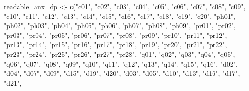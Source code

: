 \documentclass[
]{article}
\newenvironment{Shaded}{\begin{snugshade}}{\end{snugshade}}
\newcommand{\FunctionTok}[1]{\textcolor[rgb]{0.13,0.29,0.53}{\textbf{#1}}}
\newcommand{\NormalTok}[1]{#1}
\newcommand{\OtherTok}[1]{\textcolor[rgb]{0.56,0.35,0.01}{#1}}
\newcommand{\StringTok}[1]{\textcolor[rgb]{0.31,0.60,0.02}{#1}}
\begin{document}
\begin{Shaded}
\begin{Highlighting}[]
\NormalTok{readable\_anx\_dp }\OtherTok{\textless{}{-}} \FunctionTok{c}\NormalTok{(}\StringTok{"c01"}\NormalTok{, }\StringTok{"c02"}\NormalTok{, }\StringTok{"c03"}\NormalTok{, }\StringTok{"c04"}\NormalTok{, }\StringTok{"c05"}\NormalTok{, }\StringTok{"c06"}\NormalTok{, }\StringTok{"c07"}\NormalTok{, }\StringTok{"c08"}\NormalTok{, }\StringTok{"c09"}\NormalTok{, }\StringTok{"c10"}\NormalTok{, }\StringTok{"c11"}\NormalTok{, }\StringTok{"c12"}\NormalTok{, }\StringTok{"c13"}\NormalTok{, }\StringTok{"c14"}\NormalTok{, }\StringTok{"c15"}\NormalTok{, }\StringTok{"c16"}\NormalTok{, }\StringTok{"c17"}\NormalTok{, }\StringTok{"c18"}\NormalTok{, }\StringTok{"c19"}\NormalTok{, }\StringTok{"c20"}\NormalTok{, }
\StringTok{"ph01"}\NormalTok{, }\StringTok{"ph02"}\NormalTok{, }\StringTok{"ph03"}\NormalTok{, }\StringTok{"ph04"}\NormalTok{, }\StringTok{"ph05"}\NormalTok{, }\StringTok{"ph06"}\NormalTok{, }\StringTok{"ph07"}\NormalTok{, }\StringTok{"ph08"}\NormalTok{, }\StringTok{"ph09"}\NormalTok{, }
\StringTok{"pr01"}\NormalTok{, }\StringTok{"pr02"}\NormalTok{, }\StringTok{"pr03"}\NormalTok{, }\StringTok{"pr04"}\NormalTok{, }\StringTok{"pr05"}\NormalTok{, }\StringTok{"pr06"}\NormalTok{, }\StringTok{"pr07"}\NormalTok{, }\StringTok{"pr08"}\NormalTok{, }\StringTok{"pr09"}\NormalTok{, }\StringTok{"pr10"}\NormalTok{, }\StringTok{"pr11"}\NormalTok{, }\StringTok{"pr12"}\NormalTok{, }\StringTok{"pr13"}\NormalTok{, }\StringTok{"pr14"}\NormalTok{, }\StringTok{"pr15"}\NormalTok{, }\StringTok{"pr16"}\NormalTok{, }\StringTok{"pr17"}\NormalTok{, }\StringTok{"pr18"}\NormalTok{, }\StringTok{"pr19"}\NormalTok{, }\StringTok{"pr20"}\NormalTok{, }\StringTok{"pr21"}\NormalTok{, }\StringTok{"pr22"}\NormalTok{, }\StringTok{"pr23"}\NormalTok{, }\StringTok{"pr24"}\NormalTok{, }\StringTok{"pr25"}\NormalTok{, }\StringTok{"pr26"}\NormalTok{, }\StringTok{"pr27"}\NormalTok{, }\StringTok{"pr28"}\NormalTok{, }
\StringTok{"q01"}\NormalTok{, }\StringTok{"q02"}\NormalTok{, }\StringTok{"q03"}\NormalTok{, }\StringTok{"q04"}\NormalTok{, }\StringTok{"q05"}\NormalTok{, }\StringTok{"q06"}\NormalTok{, }\StringTok{"q07"}\NormalTok{, }\StringTok{"q08"}\NormalTok{, }\StringTok{"q09"}\NormalTok{, }\StringTok{"q10"}\NormalTok{, }\StringTok{"q11"}\NormalTok{, }\StringTok{"q12"}\NormalTok{, }\StringTok{"q13"}\NormalTok{, }\StringTok{"q14"}\NormalTok{, }\StringTok{"q15"}\NormalTok{, }\StringTok{"q16"}\NormalTok{, }
\StringTok{"d02"}\NormalTok{, }\StringTok{"d04"}\NormalTok{, }\StringTok{"d07"}\NormalTok{, }\StringTok{"d09"}\NormalTok{, }\StringTok{"d15"}\NormalTok{, }\StringTok{"d19"}\NormalTok{, }\StringTok{"d20"}\NormalTok{, }\StringTok{"d03"}\NormalTok{, }\StringTok{"d05"}\NormalTok{, }\StringTok{"d10"}\NormalTok{, }\StringTok{"d13"}\NormalTok{, }\StringTok{"d16"}\NormalTok{, }\StringTok{"d17"}\NormalTok{, }\StringTok{"d21"}\NormalTok{, }

\end{Highlighting}
\end{Shaded}
\end{document}
